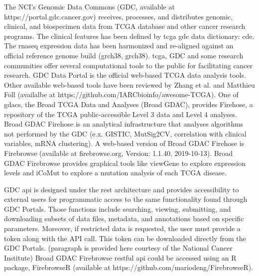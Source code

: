 \documentclass[jpm,article,submit,moreauthors,pdftex]{Definitions/mdpi}
\newenvironment{MyColorPar}[1]{%
    \leavevmode\color{#1}\ignorespaces%
}{%
}%
\begin{document}
\begin{paracol}{2}
\begin{MyColorPar}{red}
The NCI's Genomic Data Commons (GDC, available at https://portal.gdc.cancer.gov) receives, processes, and distributes genomic, clinical, and biospecimen data from TCGA database and other cancer research programs. The clinical features has been defined by \acrshort{tcga} \acrshort{gdc} data dictionary: \acrfull{cde}\cite{CDE2019}. The \acrshort{rnaseq} expression data has been harmonized and re-aligned against an official reference genome build (\acrlong{grch38}, \acrshort{grch38}).
\acrshort{tcga}, GDC and some research communities offer several computational tools to the public for facilitating cancer research. %
GDC Data Portal is the official web-based TCGA data analysis tools. Other available web-based tools have been reviewed by Zhang et al.\cite{Zhang2019b} and 
Matthieu Foll (availalbe at https://github.com/IARCbioinfo/awesome-TCGA).
One of \acrshort{gdac}s, the Broad TCGA Data and Analyses (Broad GDAC), provides Firehose, a repository of the TCGA public-accessible Level 3 data and Level 4 analyses. Broad GDAC Firehose is an analytical infrastructure that analyses algorithms not performed by the GDC (e.x. GISTIC, MutSig2CV, correlation with clinical variables, mRNA clustering). 
A web-based version of Broad GDAC Firehose is Firebrowse (available at firebrowse.org, Version: 1.1.40, 2019-10-13).
Broad GDAC Firebrowse provides graphical tools like viewGene to explore expression levels and iCoMut to explore a mutation analysis of each TCGA disease. 

\end{MyColorPar}

GDC \acrfull{api} is designed under the \acrfull{rest} architecture and provides accessibility to external users for programmatic access to the same functionality found through GDC Portals. Those functions include searching, viewing, submitting, and downloading subsets of data files, metadata, and annotations based on specific parameters. Moreover, if restricted data is requested, the user must provide a token along with the API call. This token can be downloaded directly from the GDC Portals. (paragraph is provided here courtesy of the National Cancer Institute)
Broad GDAC Firebrowse \acrshort{rest}ful \acrshort{api} could be accessed using an R package, FirebrowseR (available at https://github.com/mariodeng/FirebrowseR)\cite{Deng2017}.


\end{paracol}
\end{document}
